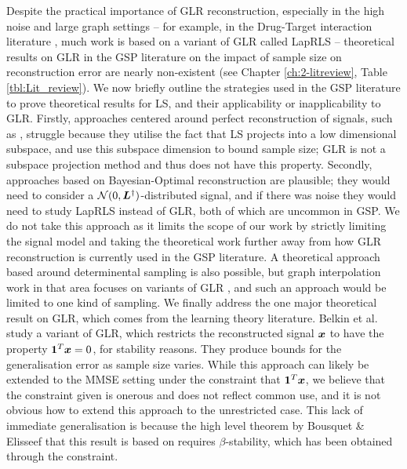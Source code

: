 {Despite the practical importance of GLR reconstruction, especially in the high noise and large graph settings -- for example, in the Drug-Target interaction literature} \cite{chen2018machine}, {much work is based on a variant of GLR called LapRLS} \cite{belkin2006manifold} --  theoretical results on GLR in the GSP literature on the impact of sample size on reconstruction error are nearly non-existent (see Chapter \ref{ch:2-litreview}, Table \ref{tbl:Lit_review}). {We now briefly outline the strategies used in the GSP literature to prove theoretical results for LS, and their applicability or inapplicability to GLR. Firstly, approaches centered around perfect reconstruction of signals, such as} \cite{shomorony2014sampling}, {struggle because they utilise the fact that LS projects into a low dimensional subspace, and use this subspace dimension to bound sample size; GLR is not a subspace projection method and thus does not have this property. Secondly, approaches based on Bayesian-Optimal reconstruction are plausible; they would need to consider a} $\mathcal{N}(0,\bm{L}^{\dagger})$-distributed {signal, and if there was noise they would need to study LapRLS instead of GLR, both of which are uncommon in GSP. We do not take this approach as it limits the scope of our work by strictly limiting the signal model and taking the theoretical work further away from how GLR reconstruction is currently used in the GSP literature. A theoretical approach based around determinental sampling is also possible, but graph interpolation work in that area focuses on variants of GLR} \cite[(4.29)]{tremblay2024graph}, {and such an approach would be limited to one kind of sampling. We finally address the one major theoretical result on GLR, which comes from the learning theory literature. Belkin et al.} \cite{belkin2006manifold} {study a variant of GLR, which restricts the reconstructed signal} $\bm{x}$ to have the property $\bm{1}^{T}\bm{x} = 0$, {for stability reasons. They produce bounds for the generalisation error as sample size varies. While this approach can likely be extended to the MMSE setting under the constraint that} $\bm{1}^{T}\bm{x}${, we believe that the constraint given is onerous and does not reflect common use, and it is not obvious how to extend this approach to the unrestricted case. This lack of immediate generalisation is because the high level theorem by Bousquet \& Elisseef that this result is based on} \cite[Theorem 4]{belkin2004regularization} requires $\beta$-stability, {which has been obtained through the constraint.}

